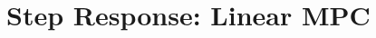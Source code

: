 \ETHslide
\section*{Step Response: Linear MPC}
\vspace*{\fill}

\begin{minipage}{0.5\textwidth}
	\centering
	\tiny{
	
	}
\end{minipage}
\begin{minipage}{0.5\textwidth}
\tiny{

}
\end{minipage}

\vspace*{\fill}
\clearpage